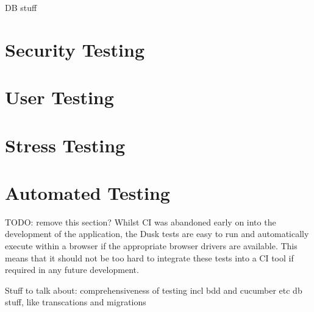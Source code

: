 DB stuff

\section{Security Testing}


\section{User Testing}


\section{Stress Testing}


\section{Automated Testing}
TODO: remove this section?
Whilst CI was abandoned early on into the development of the application, the Dusk tests are easy to run and automatically execute within a browser if the appropriate browser drivers are available. This means that it should not be too hard to integrate these tests into a CI tool if required in any future development.


Stuff to talk about:
comprehensiveness of testing incl bdd and cucumber etc
db stuff, like transcations and migrations
